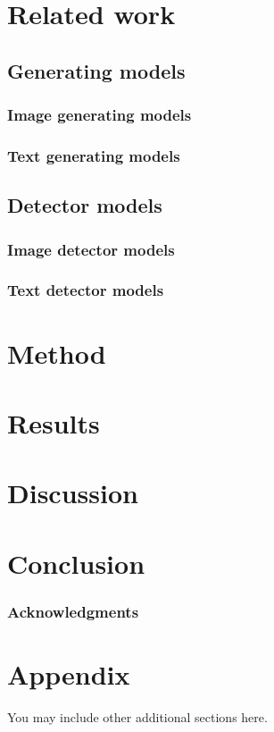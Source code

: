 \documentclass{article} %
\begin{document}
\section{Related work}

\subsection{Generating models}

\subsubsection{Image generating models}

\subsubsection{Text generating models}

\subsection{Detector models}

\subsubsection{Image detector models}

\subsubsection{Text detector models}

\section{Method}

\section{Results}

\section{Discussion}

\section{Conclusion}


\subsubsection*{Acknowledgments}





\appendix
\section{Appendix}
You may include other additional sections here.
\end{document}
